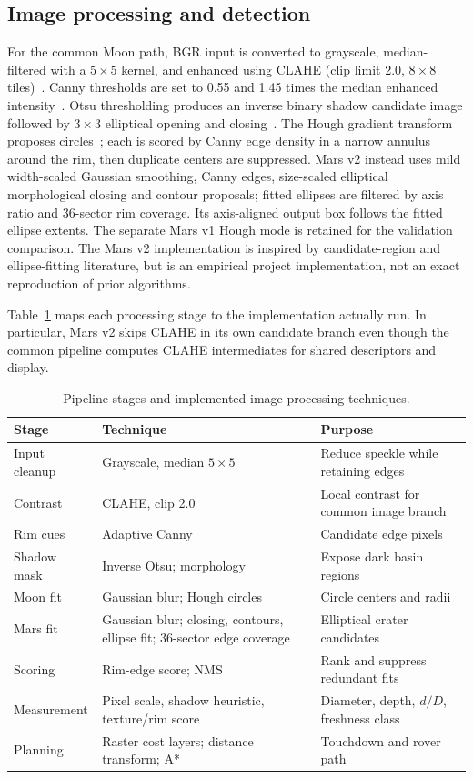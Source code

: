\documentclass[conference]{IEEEtran}
\begin{document}
\subsection{Image processing and detection}
For the common Moon path, BGR input is converted to grayscale, median-filtered with a $5\times5$ kernel, and enhanced using CLAHE (clip limit 2.0, $8\times8$ tiles)~\cite{zuiderveld1994,gonzalez2018}. Canny thresholds are set to 0.55 and 1.45 times the median enhanced intensity~\cite{canny1986}. Otsu thresholding produces an inverse binary shadow candidate image followed by $3\times3$ elliptical opening and closing~\cite{otsu1979}. The Hough gradient transform proposes circles~\cite{duda1972}; each is scored by Canny edge density in a narrow annulus around the rim, then duplicate centers are suppressed. Mars v2 instead uses mild width-scaled Gaussian smoothing, Canny edges, size-scaled elliptical morphological closing and contour proposals; fitted ellipses are filtered by axis ratio and 36-sector rim coverage. Its axis-aligned output box follows the fitted ellipse extents. The separate Mars v1 Hough mode is retained for the validation comparison. The Mars v2 implementation is inspired by candidate-region and ellipse-fitting literature, but is an empirical project implementation, not an exact reproduction of prior algorithms.

Table~\ref{tab:pipeline} maps each processing stage to the implementation actually run. In particular, Mars v2 skips CLAHE in its own candidate branch even though the common pipeline computes CLAHE intermediates for shared descriptors and display.

\begin{table}[!t]
\caption{Pipeline stages and implemented image-processing techniques.}
\label{tab:pipeline}
\centering\scriptsize
\begin{tabularx}{\columnwidth}{p{}p{}X}
\toprule Stage & Technique & Purpose \\
\midrule
Input cleanup & Grayscale, median $5\times5$ & Reduce speckle while retaining edges \\
Contrast & CLAHE, clip 2.0 & Local contrast for common image branch \\
Rim cues & Adaptive Canny & Candidate edge pixels \\
Shadow mask & Inverse Otsu; morphology & Expose dark basin regions \\
Moon fit & Gaussian blur; Hough circles & Circle centers and radii \\
Mars fit & Gaussian blur; closing, contours, ellipse fit; 36-sector edge coverage & Elliptical crater candidates \\
Scoring & Rim-edge score; NMS & Rank and suppress redundant fits \\
Measurement & Pixel scale, shadow heuristic, texture/rim score & Diameter, depth, $d/D$, freshness class \\
Planning & Raster cost layers; distance transform; A* & Touchdown and rover path \\
\bottomrule
\end{tabularx}
\end{table}
\end{document}
